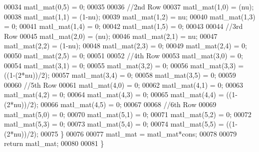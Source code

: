 \begin{DoxyCode}
00034         matl\_mat(0,5) = 0;
00035 
00036         \textcolor{comment}{//2nd Row}
00037         matl\_mat(1,0) = (nu);
00038                 matl\_mat(1,1) = (1-nu);
00039                 matl\_mat(1,2) = nu;
00040                 matl\_mat(1,3) = 0;
00041                 matl\_mat(1,4) = 0;
00042                 matl\_mat(1,5) = 0;
00043 
00044         \textcolor{comment}{//3rd Row}
00045         matl\_mat(2,0) = (nu);
00046                 matl\_mat(2,1) = nu;
00047                 matl\_mat(2,2) = (1-nu);
00048                 matl\_mat(2,3) = 0;
00049                 matl\_mat(2,4) = 0;
00050                 matl\_mat(2,5) = 0;
00051 
00052         \textcolor{comment}{//4th Row}
00053         matl\_mat(3,0) = 0;
00054                 matl\_mat(3,1) = 0;
00055                 matl\_mat(3,2) = 0;
00056                 matl\_mat(3,3) = ((1-(2*nu))/2);
00057                 matl\_mat(3,4) = 0;
00058                 matl\_mat(3,5) = 0;
00059 
00060         \textcolor{comment}{//5th Row}
00061         matl\_mat(4,0) = 0;
00062                 matl\_mat(4,1) = 0;
00063                 matl\_mat(4,2) = 0;
00064                 matl\_mat(4,3) = 0;
00065                 matl\_mat(4,4) = ((1-(2*nu))/2);
00066                 matl\_mat(4,5) = 0;
00067 
00068         \textcolor{comment}{//6th Row}
00069         matl\_mat(5,0) = 0;
00070                 matl\_mat(5,1) = 0;
00071                 matl\_mat(5,2) = 0;
00072                 matl\_mat(5,3) = 0;
00073                 matl\_mat(5,4) = 0;
00074                 matl\_mat(5,5) = ((1-(2*nu))/2);
00075     \}
00076 
00077     matl\_mat = matl\_mat*cons;
00078 
00079     \textcolor{keywordflow}{return} matl\_mat;
00080 
00081 \}
\end{DoxyCode}
